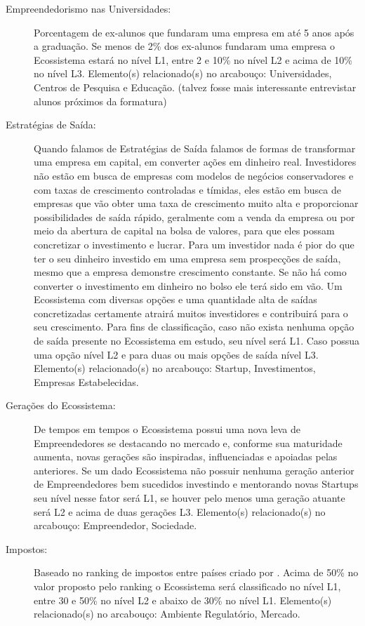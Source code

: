 \begin{description}
  \item [Empreendedorismo nas Universidades:] Porcentagem de ex-alunos que fundaram uma empresa em até 5 anos após a graduação. Se menos de 2\% dos ex-alunos fundaram uma empresa o Ecossistema estará no nível L1, entre 2 e 10\% no nível L2 e acima de 10\% no nível L3. Elemento(s) relacionado(s) no arcabouço: Universidades, Centros de Pesquisa e Educação. (talvez fosse mais interessante entrevistar alunos próximos da formatura)
  
  \item [Estratégias de Saída:] Quando falamos de Estratégias de Saída falamos de formas de transformar uma empresa em capital, em converter ações em dinheiro real. Investidores não estão em busca de empresas com modelos de negócios conservadores e com taxas de crescimento controladas e tímidas, eles estão em busca de empresas que vão obter uma taxa de crescimento muito alta e proporcionar possibilidades de saída rápido, geralmente com a venda da empresa ou por meio da abertura de capital na bolsa de valores, para que eles possam concretizar o investimento e lucrar. Para um investidor nada é pior do que ter o seu dinheiro investido em uma empresa sem prospecções de saída, mesmo que a empresa demonstre crescimento constante. Se não há como converter o investimento em dinheiro no bolso ele terá sido em vão. Um Ecossistema com diversas opções e uma quantidade alta de saídas concretizadas certamente atrairá muitos investidores e contribuirá para o seu crescimento. Para fins de classificação, caso não exista nenhuma opção de saída presente no Ecossistema em estudo, seu nível será L1. Caso possua uma opção nível L2 e para duas ou mais opções de saída nível L3. Elemento(s) relacionado(s) no arcabouço: Startup, Investimentos, Empresas Estabelecidas.
  
  \item [Gerações do Ecossistema:] De tempos em tempos o Ecossistema possui uma nova leva de Empreendedores se destacando no mercado e, conforme sua maturidade aumenta, novas gerações são inspiradas, influenciadas e apoiadas pelas anteriores. Se um dado Ecossistema não possuir nenhuma geração anterior de Empreendedores bem sucedidos investindo e mentorando novas Startups seu nível nesse fator será L1, se houver pelo menos uma geração atuante será L2 e acima de duas gerações L3. Elemento(s) relacionado(s) no arcabouço: Empreendedor, Sociedade.
  
  \item [Impostos:] Baseado no ranking de impostos entre países criado por . Acima de 50\% no valor proposto pelo ranking o Ecossistema será classificado no nível L1, entre 30 e 50\% no nível L2 e abaixo de 30\% no nível L1. Elemento(s) relacionado(s) no arcabouço: Ambiente Regulatório, Mercado.
  

\end{description}
